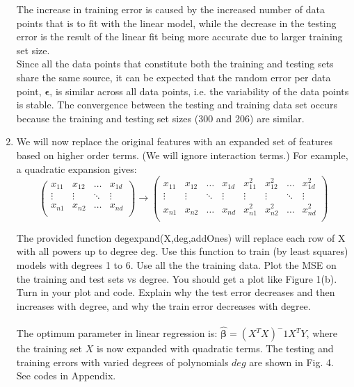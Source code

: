 \documentclass[11pt]{article}
\newcommand{\mtx}[1]{\mathbf{#1}}
\def \mepsilon {\mtx{\epsilon}}
\def \mbeta {\mtx{\beta}}
\begin{document}
\begin{enumerate}
The increase in training error is caused by the increased number of data points that is to fit with the linear model, while the decrease in the testing error is the result of the linear fit being more accurate due to larger training set size. \\
Since all the data points that constitute both the training and testing sets share the same source, it can be expected that the  random error per data point, $\mepsilon$, is similar across all data points, i.e. the variability of the data points is stable. The convergence between the testing and training data set occurs because the training and testing set sizes (300 and 206) are similar.
\\


	\item We will now replace the original features with an expanded set of features based on higher order terms. (We
	will ignore interaction terms.) For example, a quadratic expansion gives:
	\begin{equation}
		\begin{pmatrix}
			x_{11} & x_{12} & \dots & x_{1d} \\
			\vdots& \vdots & \ddots & \vdots \\
			x_{n1}& x_{n2} & \dots & x_{nd} \\
		\end{pmatrix}\xrightarrow[]{}\begin{pmatrix}
			x_{11} & x_{12} & \dots & x_{1d}& x_{11}^2 & x_{12}^2 & \dots & x_{1d}^2\\
			\vdots& \vdots & \ddots & \vdots&\vdots& \vdots & \ddots & \vdots \\
			x_{n1}& x_{n2} & \dots & x_{nd}& x_{n1}^2& x_{n2}^2 & \dots & x_{nd}^2\\
		\end{pmatrix}
	\end{equation}

The provided function degexpand(X,deg,addOnes) will replace each row of X with all powers up to degree deg. Use
this function to train (by least squares) models with degrees 1 to 6. Use all the the training data. Plot the MSE on
the training and test sets vs degree. You should get a plot like Figure 1(b). Turn in your plot and code. Explain
why the test error decreases and then increases with degree, and why the train error decreases with degree.
\\ \\

The optimum parameter in linear regression is: $\hat{\mbeta}=(X^TX)^-1X^TY$, where the training set $X$ is now expanded with quadratic terms. The testing and training errors with varied degrees of polynomials $deg$ are shown in Fig. 4. See codes in Appendix.


\end{enumerate}
\end{document}
